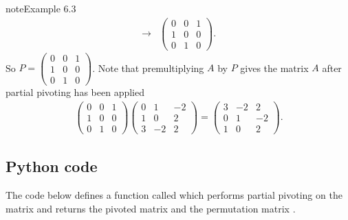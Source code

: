 \documentclass[letterpaper,10pt,english]{jupyterBook}
\begin{document}
\begin{sphinxadmonition}{note}{Example 6.3}
\begin{align*}
    \longrightarrow
    &\begin{pmatrix}
        0 & 0 & 1 \\
        1 & 0 & 0 \\
        0 & 1 & 0
    \end{pmatrix}.
\end{align*}
\sphinxAtStartPar
So
\(P=\begin{pmatrix}
    0 & 0 & 1\\
    1 & 0 & 0\\
    0 & 1 & 0
\end{pmatrix}\). Note that pre\sphinxhyphen{}multiplying \(A\) by \(P\) gives the matrix \(A\) after partial pivoting has been applied
\begin{align*}
    \begin{pmatrix}
        0 & 0 & 1\\
        1 & 0 & 0\\
        0 & 1 & 0
    \end{pmatrix}
    \begin{pmatrix}
        0 & 1 & -2\\
        1 & 0 & 2\\
        3 & -2 & 2
    \end{pmatrix} =
    \begin{pmatrix}
        3 & -2 & 2\\
        0 & 1 & -2\\
        1 & 0 & 2
    \end{pmatrix}.
\end{align*}\end{sphinxadmonition}


\subsection{Python code}
\label{\detokenize{6_Direct_methods/6.2_LUP_decomposition:python-code}}
\sphinxAtStartPar
The code below defines a function called  which performs partial pivoting on the matrix  and returns the pivoted matrix  and the permutation matrix .
\end{document}
